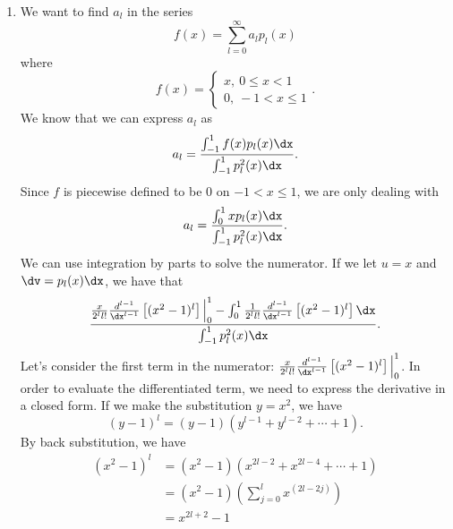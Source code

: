 \documentclass{hw}
\begin{document}
\begin{enumerate}
\item We want to find $a_{l}$ in the series
\[
f(x) = \sum_{l=0}^{\infty}a_{l}p_{l}(x)
\]
where
\[
f(x)=
\begin{cases}
x,\ 0\leq x < 1\\
0,\ -1 < x \leq 1
\end{cases}.
\]
We know that we can express $a_{l}$ as
\[
a_{l} = {%
\int_{-1}^{1}f(x)p_{l}(x)\dx%
\over%
\int_{-1}^{1}p_{l}^{2}(x)\dx%
}.
\]
Since $f$ is piecewise defined to be $0$ on $-1 < x \leq 1$, we are only dealing with
\[
a_{l} = {%
\int_{0}^{1}xp_{l}(x)\dx%
\over%
\int_{-1}^{1}p_{l}^{2}(x)\dx%
}.
\]
We can use integration by parts to solve the numerator. If we let $u = x$ and
$\dv = p_{l}(x)\dx$, we have that
\[
{%
{x\over2^{l}l!}{d^{l-1}\over\dx^{l-1}}\left[(x^{2}-1)^l\right]\Big|_{0}^{1}%
-\int_{0}^{1}{1\over2^{l}l!}{d^{l-1}\over\dx^{l-1}}\left[(x^{2}-1)^l\right]\dx%
\over%
\int_{-1}^{1}p_{l}^{2}(x)\dx%
}.
\]
Let's consider the first term in the numerator:
${x\over2^{l}l!}{d^{l-1}\over\dx^{l-1}}\left[(x^{2}-1)^l\right]\Big|_{0}^{1}$.
In order to evaluate the differentiated term, we need to express the derivative in a closed form.
If we make the substitution $y=x^{2}$, we have
\[
(y-1)^{l} = (y-1)(y^{l-1}+y^{l-2}+\cdots+1).
\]
By back substitution, we have
\begin{align*}
(x^{2}-1)^{l} &= (x^2-1)(x^{2l-2}+x^{2l-4}+\cdots+1)\\
&= (x^2-1)(\sum_{j=0}^{l}x^{(2l-2j)})\\
&= x^{2l+2}-1
\end{align*}

\end{enumerate}
\end{document}
